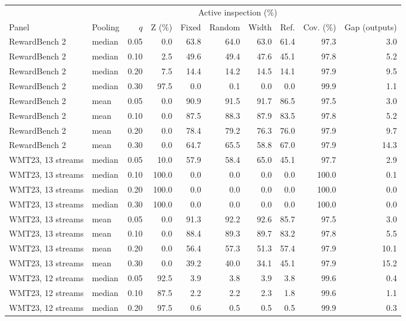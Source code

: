 \begin{table}[t]
\centering\small
\begin{tabular}{llrrrrrrrr}
\toprule
 & & & & \multicolumn{4}{c}{Active inspection (\%)} & & \\
Panel & Pooling & $q$ & Z (\%) & Fixed & Random & Width & Ref. & Cov. (\%) & Gap (outputs) \\
\midrule
RewardBench 2 & median & 0.05 & 0.0 & 63.8 & 64.0 & 63.0 & 61.4 & 97.3 & 3.0 \\
RewardBench 2 & median & 0.10 & 2.5 & 49.6 & 49.4 & 47.6 & 45.1 & 97.8 & 5.2 \\
RewardBench 2 & median & 0.20 & 7.5 & 14.4 & 14.2 & 14.5 & 14.1 & 97.9 & 9.5 \\
RewardBench 2 & median & 0.30 & 97.5 & 0.0 & 0.1 & 0.0 & 0.0 & 99.9 & 1.1 \\
RewardBench 2 & mean & 0.05 & 0.0 & 90.9 & 91.5 & 91.7 & 86.5 & 97.5 & 3.0 \\
RewardBench 2 & mean & 0.10 & 0.0 & 87.5 & 88.3 & 87.9 & 83.5 & 97.8 & 5.2 \\
RewardBench 2 & mean & 0.20 & 0.0 & 78.4 & 79.2 & 76.3 & 76.0 & 97.9 & 9.7 \\
RewardBench 2 & mean & 0.30 & 0.0 & 64.7 & 65.5 & 58.8 & 67.0 & 97.9 & 14.3 \\
WMT23, 13 streams & median & 0.05 & 10.0 & 57.9 & 58.4 & 65.0 & 45.1 & 97.7 & 2.9 \\
WMT23, 13 streams & median & 0.10 & 100.0 & 0.0 & 0.0 & 0.0 & 0.0 & 100.0 & 0.1 \\
WMT23, 13 streams & median & 0.20 & 100.0 & 0.0 & 0.0 & 0.0 & 0.0 & 100.0 & 0.0 \\
WMT23, 13 streams & median & 0.30 & 100.0 & 0.0 & 0.0 & 0.0 & 0.0 & 100.0 & 0.0 \\
WMT23, 13 streams & mean & 0.05 & 0.0 & 91.3 & 92.2 & 92.6 & 85.7 & 97.5 & 3.0 \\
WMT23, 13 streams & mean & 0.10 & 0.0 & 88.4 & 89.3 & 89.7 & 83.2 & 97.8 & 5.5 \\
WMT23, 13 streams & mean & 0.20 & 0.0 & 56.4 & 57.3 & 51.3 & 57.4 & 97.9 & 10.1 \\
WMT23, 13 streams & mean & 0.30 & 0.0 & 39.2 & 40.0 & 34.1 & 45.1 & 97.9 & 15.2 \\
WMT23, 12 streams & median & 0.05 & 92.5 & 3.9 & 3.8 & 3.9 & 3.8 & 99.6 & 0.4 \\
WMT23, 12 streams & median & 0.10 & 87.5 & 2.2 & 2.2 & 2.3 & 1.8 & 99.6 & 1.1 \\
WMT23, 12 streams & median & 0.20 & 97.5 & 0.6 & 0.5 & 0.5 & 0.5 & 99.9 & 0.3 \\

\end{tabular}
\end{table}
